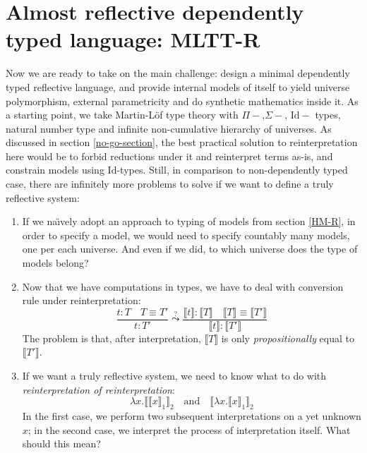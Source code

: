 \section{Almost reflective dependently typed language:
    MLTT-R}
\label{MLTT-R}

Now we are ready to take on the main challenge: design a
minimal dependently typed reflective language, and
provide internal models of itself to yield universe
polymorphism, external parametricity and do synthetic
mathematics inside it. As a starting point, we take
Martin-L\"of type theory with $\Pi-$,$\Sigma-$,
$\mathrm{Id}-$ types, natural number type and infinite
non-cumulative hierarchy of universes. As discussed in
section \ref{no-go-section}, the best practical solution
to reinterpretation here would be to forbid reductions
under it and reinterpret terms as-is, and constrain
models using $\mathrm{Id}$-types. Still, in comparison
to non-dependently typed case, there are infinitely more
problems to solve if we want to define a truly
reflective system:

\begin{enumerate}
    \item If we na\"{\i}vely adopt an approach to typing
        of models from section \ref{HM-R}, in order to
        specify a model, we would need to specify
        countably many models, one per each universe.
        And even if we did, to which universe does the
        type of models belong?
    \item Now that we have computations in types, we
        have to deal with conversion rule under
        reinterpretation:
        \[
            \dfrac{t:T\quad T\equiv T'}{t:T'}
            \stackrel{?}{\leadsto}
            \dfrac{\llbracket t\rrbracket:\llbracket T
            \rrbracket\quad\llbracket T\rrbracket\equiv
            \llbracket T'\rrbracket}{\llbracket t
            \rrbracket:\llbracket T'\rrbracket}
        \]
        The problem is that, after interpretation,
        $\llbracket T \rrbracket$ is only
        \textit{propositionally} equal to $\llbracket T'
        \rrbracket$.
    \item If we want a truly reflective system, we need
        to know what to do with \textit{reinterpretation
        of reinterpretation}:
        \[
            \lambda x.\llbracket\llbracket x\rrbracket_1
            \rrbracket_2
            \quad\text{and}\quad
            \llbracket\lambda x.\llbracket x\rrbracket_1
            \rrbracket_2
        \]
        In the first case, we perform two subsequent
        interpretations on a yet unknown $x$; in the
        second case, we interpret the process of
        interpretation itself. What should this mean?
\end{enumerate}

